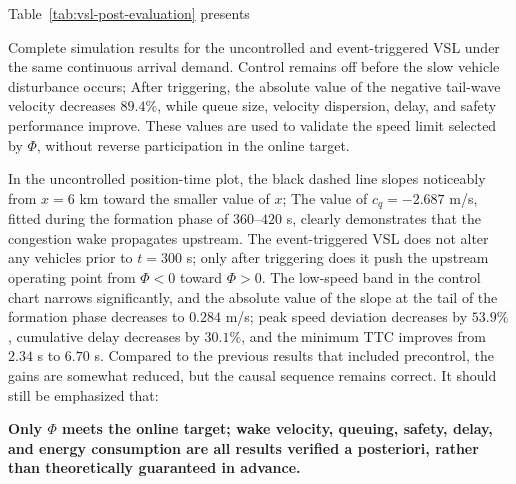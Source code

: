 \documentclass[11pt,a4paper,openany]{book}
\numberwithin{equation}{chapter}
\numberwithin{figure}{chapter}
\numberwithin{table}{chapter}
\newcommand{\tabletext}[2]{%
  \par\smallskip\noindent
  Table~\ref{#1} presents #2
\par\smallskip
}
\begin{document}
\tabletext{tab:vsl-post-evaluation}{




Complete simulation results for the uncontrolled and event-triggered VSL under the same continuous arrival demand. Control remains off before the slow vehicle disturbance occurs; After triggering, the absolute value of the negative tail-wave velocity decreases $89.4\%$, while queue size, velocity dispersion, delay, and safety performance improve. These values are used to validate the speed limit selected by $\Phi$, without reverse participation in the online target.}





In the uncontrolled position-time plot, the black dashed line slopes noticeably from $x=6$ km toward the smaller value of $x$; The value of $c_q=-2.687$ m/s, fitted during the formation phase of $360$–$420$ s, clearly demonstrates that the congestion wake propagates upstream. The event-triggered VSL does not alter any vehicles prior to $t=300$ s; only after triggering does it push the upstream operating point from $\Phi<0$ toward $\Phi>0$. The low-speed band in the control chart narrows significantly, and the absolute value of the slope at the tail of the formation phase decreases to $0.284$ m/s; peak speed deviation decreases by $53.9\%$, cumulative delay decreases by $30.1\%$, and the minimum TTC improves from $2.34$ s to $6.70$ s. Compared to the previous results that included precontrol, the gains are somewhat reduced, but the causal sequence remains correct. It should still be emphasized that:




\textbf{Only $\Phi$ meets the online target; wake velocity, queuing, safety, delay, and energy consumption are all results verified a posteriori, rather than theoretically guaranteed in advance.}
\end{document}
